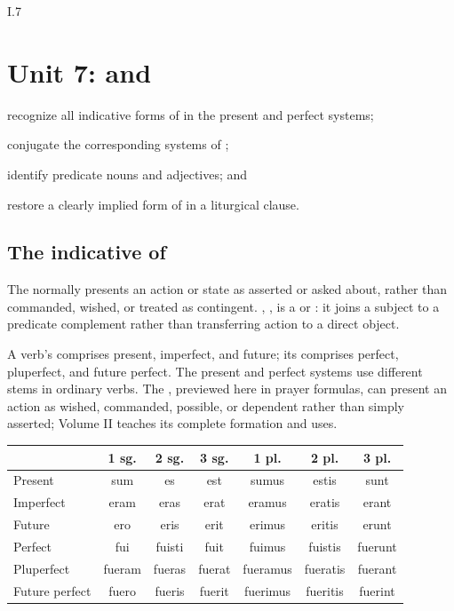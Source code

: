 \begin{courseunit}{I.7}
\chapter{Unit 7:  and }

\begin{learningobjectives}
  \item recognize all indicative forms of  in the present and
        perfect systems;
  \item conjugate the corresponding systems of ;
  \item identify predicate nouns and adjectives; and
  \item restore a clearly implied form of  in a liturgical clause.
\end{learningobjectives}

\section{The indicative of }

The  normally presents an action or state as asserted or
asked about, rather than commanded, wished, or treated as contingent.
, , is a  or : it joins
a subject to a predicate complement rather than transferring action to a
direct object.

A verb's  comprises present, imperfect, and future; its
 comprises perfect, pluperfect, and future perfect. The
present and perfect systems use different stems in ordinary verbs. The
, previewed here in prayer formulas, can present an
action as wished, commanded, possible, or dependent rather than simply
asserted; Volume II teaches its complete formation and uses.

\begin{center}\scriptsize
\begin{tabular}{@{}lcccccc@{}}
\toprule
& 1 sg. & 2 sg. & 3 sg. & 1 pl. & 2 pl. & 3 pl. \\
\midrule
Present & sum & es & est & sumus & estis & sunt \\
Imperfect & eram & eras & erat & eramus & eratis & erant \\
Future & ero & eris & erit & erimus & eritis & erunt \\
Perfect & fui & fuisti & fuit & fuimus & fuistis & fuerunt \\
Pluperfect & fueram & fueras & fuerat & fueramus & fueratis & fuerant \\
Future perfect & fuero & fueris & fuerit & fuerimus & fueritis & fuerint \\
\bottomrule
\end{tabular}
\end{center}


\end{courseunit}
